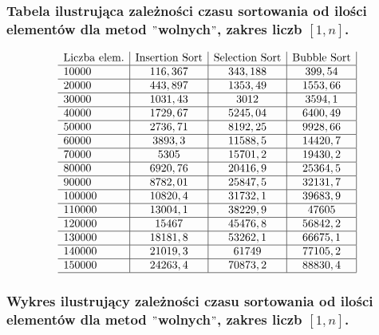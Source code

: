 \documentclass[polish,polish,a4paper]{article}
\begin{document}
\begin{spacing}{1.5}
	\subsubsection*{Tabela ilustrująca zależności czasu sortowania od ilości elementów dla metod $"$wolnych$"$, zakres liczb $ [1,n] $.}
	
	\begin{figure}[H]
			\begin{equation*}
		\begin{array}{l|c|c|c|}

		$Liczba elem.$&$Insertion Sort$&$Selection Sort$&$Bubble Sort$\\\hline
		10000&	116,367&	343,188&	399,54\\\hline
		20000&	443,897&	1353,49&	1553,66\\\hline
		30000&	1031,43&	3012&	3594,1\\\hline
		40000&	1729,67&	5245,04&	6400,49\\\hline
		50000&	2736,71&	8192,25&	9928,66\\\hline
		60000&	3893,3&	11588,5&	14420,7\\\hline
		70000&	5305&	15701,2&	19430,2\\\hline
		80000&	6920,76&	20416,9&	25364,5\\\hline
		90000&	8782,01&	25847,5&	32131,7\\\hline
		100000&	10820,4&	31732,1&	39683,9\\\hline
		110000&	13004,1&	38229,9&	47605\\\hline
		120000&	15467&	45476,8&	56842,2\\\hline
		130000&	18181,8&	53262,1&	66675,1\\\hline
		140000&	21019,3&	61749&	77105,2\\\hline
		150000&	24263,4&	70873,2&	88830,4\\
		\hline
		\end{array}
		\end{equation*}
	\end{figure}
	
	\subsubsection*{Wykres ilustrujący zależności czasu sortowania od ilości elementów dla metod $"$wolnych$"$, zakres liczb $ [1,n] $.}
	

\end{spacing}
\end{document}
